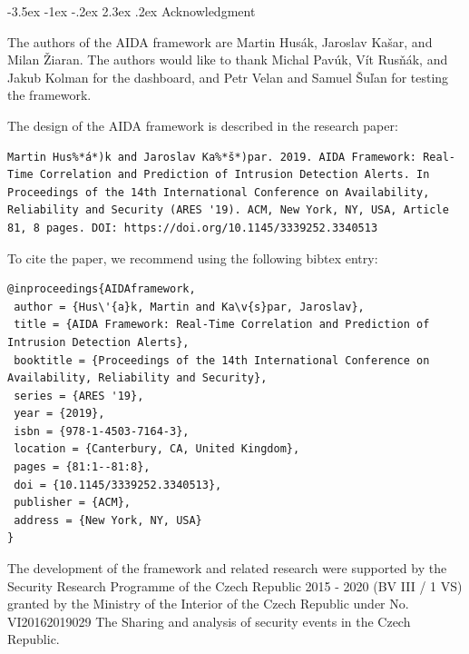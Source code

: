 \documentclass[a4paper]{article} %
\makeatletter
\renewcommand\section{\@startsection {section}{1}{\z@}%
                   {-3.5ex \@plus -1ex \@minus -.2ex}%
                   {2.3ex \@plus.2ex}%
                   {\normalfont\sffamily\Large\bfseries\color{projectcolor}}}
\renewcommand\subsection{\@startsection{subsection}{2}{\z@}%
                   {-3.25ex\@plus -1ex \@minus -.2ex}%
                   {1.5ex \@plus .2ex}%
                   {\normalfont\sffamily\large\bfseries\color{projectcolor}}}
\makeatother
\begin{document}
% 

\cleardoublepage

\section{Acknowledgment}

The authors of the AIDA framework are Martin Hus\'{a}k, Jaroslav Ka\v{s}ar, and Milan \v{Z}iaran. The authors would like to thank Michal Pav\'{u}k, V\'{i}t Rus\v{n}\'{a}k, and Jakub Kolman for the dashboard, and Petr Velan and Samuel \v{S}u\v{l}an for testing the framework.

\bigskip

The design of the AIDA framework is described in the research paper:
\begin{lstlisting}[]
Martin Hus%*á*)k and Jaroslav Ka%*š*)par. 2019. AIDA Framework: Real-Time Correlation and Prediction of Intrusion Detection Alerts. In Proceedings of the 14th International Conference on Availability, Reliability and Security (ARES '19). ACM, New York, NY, USA, Article 81, 8 pages. DOI: https://doi.org/10.1145/3339252.3340513
\end{lstlisting}

To cite the paper, we recommend using the following bibtex entry:
\begin{lstlisting}[]
@inproceedings{AIDAframework,
 author = {Hus\'{a}k, Martin and Ka\v{s}par, Jaroslav},
 title = {AIDA Framework: Real-Time Correlation and Prediction of Intrusion Detection Alerts},
 booktitle = {Proceedings of the 14th International Conference on Availability, Reliability and Security},
 series = {ARES '19},
 year = {2019},
 isbn = {978-1-4503-7164-3},
 location = {Canterbury, CA, United Kingdom},
 pages = {81:1--81:8},
 doi = {10.1145/3339252.3340513},
 publisher = {ACM},
 address = {New York, NY, USA}
}
\end{lstlisting}

The development of the framework and related research were supported by the Security Research Programme of the Czech Republic 2015 - 2020 (BV III / 1 VS) granted by the Ministry of the Interior of the Czech Republic under No. VI20162019029 The Sharing and analysis of security events in the Czech Republic.
\end{document}
